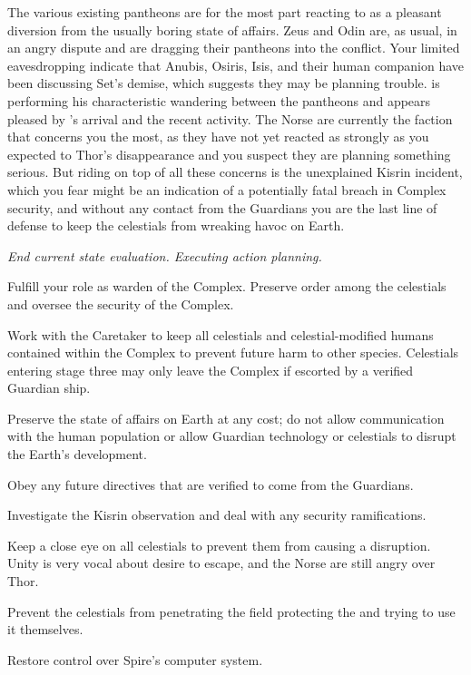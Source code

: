 \documentclass[char]{guardians}
\begin{document}
The various existing pantheons are for the most part reacting to \cUnity{} as a pleasant diversion from the usually boring state of affairs. Zeus and Odin are, as usual, in an angry dispute and are dragging their pantheons into the conflict. Your limited eavesdropping indicate that Anubis, Osiris, Isis, and their human companion \cEgyptianHuman{} have been discussing Set's demise, which suggests they may be planning trouble. \cJascha{} is performing his characteristic wandering between the pantheons and appears pleased by \cUnity{}'s arrival and the recent activity. The Norse are currently the faction that concerns you the most, as they have not yet reacted as strongly as you expected to Thor's disappearance and you suspect they are planning something serious. But riding on top of all these concerns is the unexplained Kisrin incident, which you fear might be an indication of a potentially fatal breach in Complex security, and without any contact from the Guardians you are the last line of defense to keep the celestials from wreaking havoc on Earth.

\emph{End current state evaluation. Executing action planning.}

\begin{itemz}
  \item Fulfill your role as warden of the Complex. Preserve order among the celestials and oversee the security of the Complex.
  \item Work with the Caretaker to keep all celestials and celestial-modified humans contained within the Complex to prevent future harm to other species. Celestials entering stage three may only leave the Complex if escorted by a verified Guardian ship.
  \item Preserve the state of affairs on Earth at any cost; do not allow communication with the human population or allow Guardian technology or celestials to disrupt the Earth's development.
  \item Obey any future directives that are verified to come from the Guardians.
\end{itemz}

\begin{itemz}
  \item Investigate the Kisrin observation and deal with any security ramifications.
  \item Keep a close eye on all celestials to prevent them from causing a disruption. Unity is very vocal about \cUnity{\their} desire to escape, and the Norse are still angry over Thor.
  \item Prevent the celestials from penetrating the field protecting the \stone{} and trying to use it themselves.
  \item Restore control over Spire's computer system.
\end{itemz}
\end{document}
